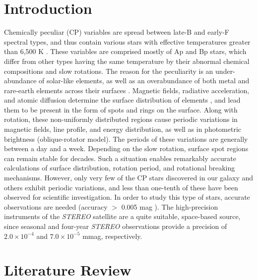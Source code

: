 \documentclass[]{article}
\begin{document}
\section{Introduction}
Chemically peculiar (CP) variables are spread between late-B and early-F spectral types, and thus contain various stars with effective temperatures greater than 6,500 K \cite{bib1}. These variables are comprised mostly of Ap and Bp stars, which differ from other types having the same temperature by their abnormal chemical compositions and slow rotations. The reason for the peculiarity is an under-abundance of solar-like elements, as well as an overabundance of both metal and rare-earth elements across their surfaces \cite{bib2}. Magnetic fields, radiative acceleration, and atomic diffusion determine the surface distribution of elements \cite{bib3}, and lead them to be present in the form of spots and rings on the surface. Along with rotation, these non-uniformly distributed regions cause periodic variations in magnetic fields, line profile, and energy distribution, as well as in photometric brightness (oblique-rotator model). The periods of these variations are generally between a day and a week. Depending on the slow rotation, surface spot regions can remain stable for decades. Such a situation enables remarkably accurate calculations of surface distribution, rotation period, and rotational breaking mechanisms. However, only very few of the CP stars discovered in our galaxy and others exhibit periodic variations, and less than one-tenth of these have been observed for scientific investigation. In order to study this type of stars, accurate observations are needed (accuracy $>$ 0.005 mag \cite{bib2}). The high-precision instruments of the {\sl STEREO} satellite are a quite suitable, space-based source, since seasonal and four-year {\sl STEREO} observations provide a precision of $2.0 \times10^{-4}$ and $7.0 \times 10^{-5}$ mmag, respectively. 



\section{Literature Review}
\end{document}
